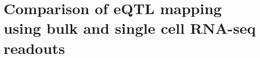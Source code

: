 
\chapter{Comparison of eQTL mapping using bulk and single cell RNA-seq readouts}
\label{chapter3}



